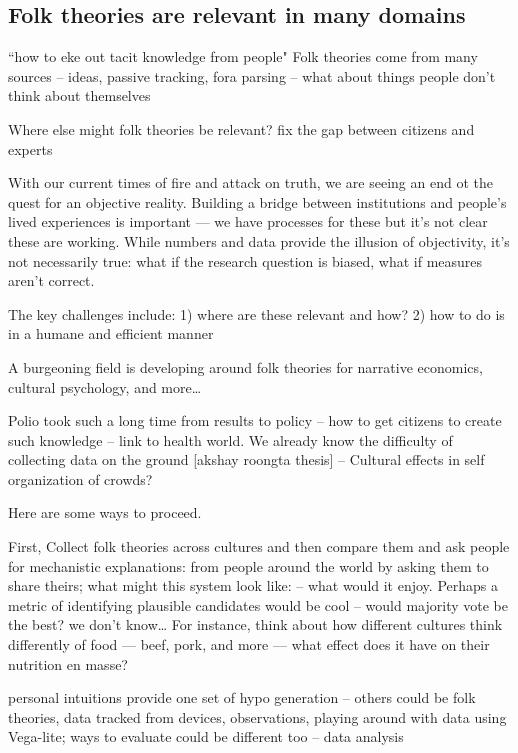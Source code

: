 \subsection{Folk theories are relevant in many domains}
“how to eke out tacit knowledge from people"
Folk theories come from many sources -- ideas, passive tracking, fora parsing
-- what about things people don't think about themselves

Where else might folk theories be relevant?
fix the gap between citizens and experts

With our current times of fire and attack on truth, we are seeing an end ot the quest for an objective reality. Building a bridge between institutions and people’s lived experiences is important — we have processes for these but it’s not clear these are working. While numbers and data provide the illusion of objectivity, it’s not necessarily true: what if the research question is biased, what if measures aren’t correct. 

The key challenges include: 1) where are these relevant and how? 2) how to do is in a humane and efficient manner

A burgeoning field is developing around folk theories for narrative economics, cultural psychology, and more… 

Polio took such a long time from results to policy --  how to get citizens to create such knowledge -- link to health world. We already know the difficulty of collecting data on the ground [akshay roongta thesis] -- Cultural effects in self organization of crowds?

Here are some ways to proceed.

First, Collect folk theories across cultures and then compare them and ask people for mechanistic explanations: from people around the world by asking them to share theirs; what might this system look like: -- what would it enjoy. Perhaps a metric of identifying plausible candidates would be cool -- would majority vote be the best? we don't know… For instance, think about how different cultures think differently of food — beef, pork, and more — what effect does it have on their nutrition en masse?

personal intuitions provide one set of hypo generation -- others could be folk theories, data tracked from devices, observations, playing around with data using Vega-lite; ways to evaluate could be different too -- data analysis

